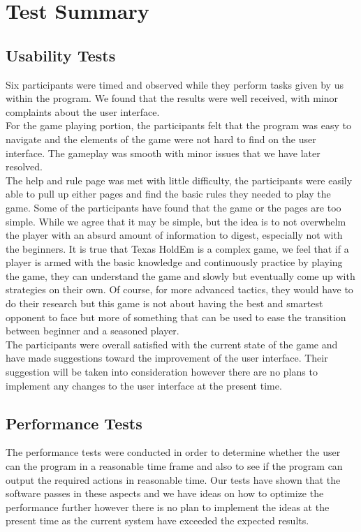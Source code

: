 \documentclass[11pt]{article}
\begin{document}
	\section{Test Summary}
	\subsection{Usability Tests}
	Six participants were timed and observed while they perform tasks given by us within the program. We found that the results were well received, with minor complaints about the user interface. \\
	\newline
	For the game playing portion, the participants felt that the program was easy to navigate and the elements of the game were not hard to find on the user interface. The gameplay was smooth with minor issues that we have later resolved. \\
	\newline
	The help and rule page was met with little difficulty, the participants were easily able to pull up either pages and find the basic rules they needed to play the game. Some of the participants have found that the game or the pages are too simple. While we agree that it may be simple, but the idea is to not overwhelm the player with an absurd amount of information to digest, especially not with the beginners. It is true that Texas HoldEm is a complex game, we feel that if a player is armed with the basic knowledge and continuously practice by playing the game, they can understand the game and slowly but eventually come up with strategies on their own. Of course, for more advanced tactics, they would have to do their research but this game is not about having the best and smartest opponent to face but more of something that can be used to ease the transition between beginner and a seasoned player. \\
	\newline 
	The participants were overall satisfied with the current state of the game and have made suggestions toward the improvement of the user interface. Their suggestion will be taken into consideration however there are no plans to implement any changes to the user interface at the present time.
	\subsection{Performance Tests}
	The performance tests were conducted in order to determine whether the user can the program in a reasonable time frame and also to see if the program can output the required actions in reasonable time. Our tests have shown that the software passes in these aspects and we have ideas on how to optimize the performance further however there is no plan to implement the ideas at the present time as the current system have exceeded the expected results. 
\end{document}
